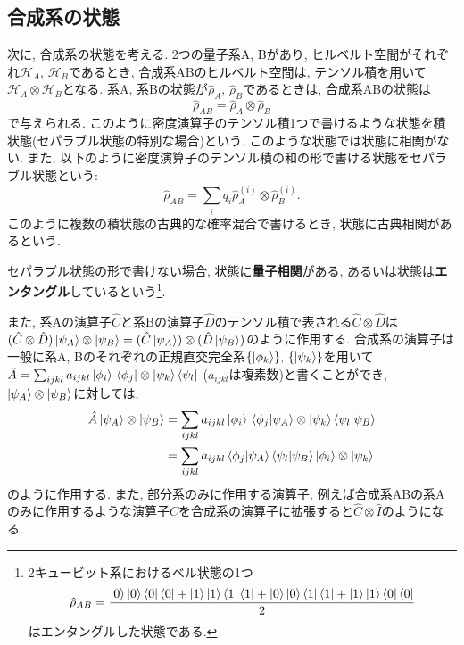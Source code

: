 \subsection{合成系の状態}
次に, 合成系の状態を考える. 2つの量子系A, Bがあり, ヒルベルト空間がそれぞれ\(\mathcal{H}_A,\,\mathcal{H}_B\)であるとき, 合成系ABのヒルベルト空間は, テンソル積を用いて\(\mathcal{H}_A\otimes\mathcal{H}_B\)となる. 系A, 系Bの状態が\(\hat{\rho}_A,\,\hat{\rho}_B\)であるときは, 合成系ABの状態は
\begin{equation}
  \hat{\rho}_{AB}=\hat{\rho}_A\otimes\hat{\rho}_B
\end{equation}
で与えられる. このように密度演算子のテンソル積1つで書けるような状態を積状態(セパラブル状態の特別な場合)という. このような状態では状態に相関がない. また, 以下のように密度演算子のテンソル積の和の形で書ける状態をセパラブル状態という:
\begin{equation}
  \hat{\rho}_{AB}=\sum_{i}q_i\hat{\rho}_A^{(i)}\otimes\hat{\rho}_B^{(i)}. 
\end{equation}
このように複数の積状態の古典的な確率混合で書けるとき, 状態に古典相関があるという. 

セパラブル状態の形で書けない場合, 状態に\textbf{量子相関}がある, あるいは状態は\textbf{エンタングル}しているという\footnote{2キュービット系におけるベル状態の1つ
\begin{equation}
\hat{\rho}_{AB}=\frac{\ket{0}\ket{0}\bra{0}\bra{0}+\ket{1}\ket{1}\bra{1}\bra{1}+\ket{0}\ket{0}\bra{1}\bra{1}+\ket{1}\ket{1}\bra{0}\bra{0}}{2}  
\end{equation} 
はエンタングルした状態である.}.

また, 系Aの演算子\(\hat{C}\)と系Bの演算子\(\hat{D}\)のテンソル積で表される\(\hat{C}\otimes\hat{D}\)は\((\hat{C}\otimes\hat{D})\ket{\psi_A}\otimes\ket{\psi_B}=(\hat{C}\ket{\psi_A})\otimes(\hat{D}\ket{\psi_B})\)のように作用する. 合成系の演算子は一般に系A, Bのそれぞれの正規直交完全系\(\{\ket{\phi_k}\},\,\{\ket{\psi_k}\}\)を用いて\(\hat{A}=\sum_{ijkl}a_{ijkl}\ket{\phi_i}\bra*{\phi _j}\otimes\ket{\psi_k}\bra{\psi_l}\) (\(a_{ijkl}\)は複素数)と書くことができ, \(\ket{\psi_A}\otimes\ket{\psi_B}\)に対しては, 
\begin{equation}
  \begin{aligned}
      \hat{A}\ket{\psi_A}\otimes\ket{\psi_B}&=\sum_{ijkl}a_{ijkl}\ket{\phi_i}\braket*{\phi _j}{\psi_A}\otimes\ket{\psi_k}\braket{\psi_l}{\psi_B}\\
      &=\sum_{ijkl}a_{ijkl}\braket*{\phi _j}{\psi_A}\braket{\psi_l}{\psi_B}\ket{\phi_i}\otimes\ket{\psi_k}
    \end{aligned}
\end{equation}
のように作用する. また, 部分系のみに作用する演算子, 例えば合成系ABの系Aのみに作用するような演算子\(\hat{C}\)を合成系の演算子に拡張すると\(\hat{C}\otimes\hat{I}\)のようになる.

